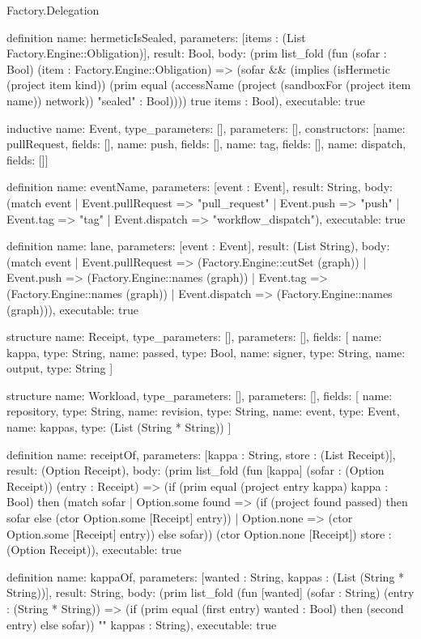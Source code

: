 \begin{lexlean}{Factory.Delegation}
\begin{semanticmodule}
definition{
  name: hermeticIsSealed,
  parameters: [items : (List Factory.Engine::Obligation)],
  result: Bool,
  body: (prim list_fold (fun (sofar : Bool) (item : Factory.Engine::Obligation) => (sofar && (implies (isHermetic (project item kind)) (prim equal (accessName (project (sandboxFor (project item name)) network)) "sealed" : Bool)))) true items : Bool),
  executable: true
}

inductive{
  name: Event,
  type_parameters: [],
  parameters: [],
  constructors: [{name: pullRequest, fields: []}, {name: push, fields: []}, {name: tag, fields: []}, {name: dispatch, fields: []}]
}

definition{
  name: eventName,
  parameters: [event : Event],
  result: String,
  body: (match event
    | Event.pullRequest => "pull_request"
    | Event.push => "push"
    | Event.tag => "tag"
    | Event.dispatch => "workflow_dispatch"),
  executable: true
}

definition{
  name: lane,
  parameters: [event : Event],
  result: (List String),
  body: (match event
    | Event.pullRequest => (Factory.Engine::cutSet (graph))
    | Event.push => (Factory.Engine::names (graph))
    | Event.tag => (Factory.Engine::names (graph))
    | Event.dispatch => (Factory.Engine::names (graph))),
  executable: true
}

structure{
  name: Receipt,
  type_parameters: [],
  parameters: [],
  fields: [
    {name: kappa, type: String},
    {name: passed, type: Bool},
    {name: signer, type: String},
    {name: output, type: String}
  ]
}

structure{
  name: Workload,
  type_parameters: [],
  parameters: [],
  fields: [
    {name: repository, type: String},
    {name: revision, type: String},
    {name: event, type: Event},
    {name: kappas, type: (List (String * String))}
  ]
}

definition{
  name: receiptOf,
  parameters: [kappa : String, store : (List Receipt)],
  result: (Option Receipt),
  body: (prim list_fold (fun [kappa] (sofar : (Option Receipt)) (entry : Receipt) => (if (prim equal (project entry kappa) kappa : Bool) then (match sofar
      | Option.some found => (if (project found passed) then sofar else (ctor Option.some [Receipt] entry))
      | Option.none => (ctor Option.some [Receipt] entry)) else sofar)) (ctor Option.none [Receipt]) store : (Option Receipt)),
  executable: true
}

definition{
  name: kappaOf,
  parameters: [wanted : String, kappas : (List (String * String))],
  result: String,
  body: (prim list_fold (fun [wanted] (sofar : String) (entry : (String * String)) => (if (prim equal (first entry) wanted : Bool) then (second entry) else sofar)) "" kappas : String),
  executable: true
}


\end{semanticmodule}
\end{lexlean}
